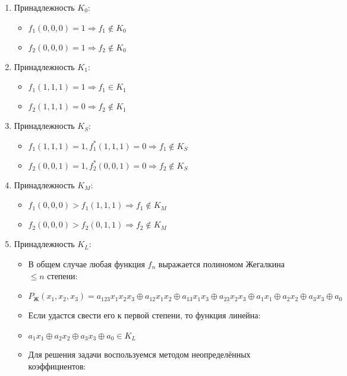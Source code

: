 \documentclass[10pt]{article}
\begin{document}
\par\begin{enumerate}
\item Принадлежность $K_0$:
    \begin{itemize}
	    \item $f_1(0,0,0) = 1 \Rightarrow f_1 \not\in K_0$
	    \item $f_2(0,0,0) = 1 \Rightarrow f_2 \not\in K_0$
    \end{itemize}
\item Принадлежность $K_1$:
    \begin{itemize}
        \item $f_1(1,1,1) = 1 \Rightarrow f_1 \in K_1$
        \item $f_2(1,1,1) = 0 \Rightarrow f_2 \not\in K_1$
    \end{itemize}
\item Принадлежность  $K_S$:
    \begin{itemize}
        \item $f_1(1,1,1) = 1, f_1^*(1,1,1) = 0 \Rightarrow f_1 \not\in K_S$
        \item $f_2(0,0,1) = 1, f_2^*(0,0,1) = 0 \Rightarrow f_2 \not\in K_S$
    \end{itemize}
\item Принадлежность $K_M$:
    \begin{itemize}
        \item $f_1(0,0,0) > f_1(1,1,1) \Rightarrow f_1 \not\in K_M$
        \item $f_2(0,0,0) > f_2(0,1,1) \Rightarrow f_2 \not\in K_M$
    \end{itemize}
\item Принадлежность $K_L$:
    \begin{itemize}
        \item В общем случае любая функция $f_n$ выражается полиномом Жегалкина $\le n$ степени:
        \item[] $P_{\text{Ж}} (x_1, x_2, x_3) = a_{123} x_1 x_2 x_3 \oplus a_{12} x_1 x_2 \oplus a_{13} x_1 x_3 \oplus a_{23} x_2 x_3 \oplus a_1 x_1 \oplus a_2 x_2 \oplus a_3 x_3 \oplus a_0$
        \item Если удастся свести его к первой степени, то функция линейна:
        \item[] $a_1 x_1 \oplus a_2 x_2 \oplus a_3 x_3 \oplus a_0 \in K_L$
        \item Для решения задачи воспользуемся методом неопределённых коэффициентов:
        \begin{enumerate}

\end{enumerate}
\end{itemize}
\end{enumerate}
\end{document}
